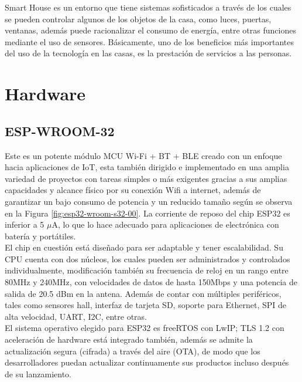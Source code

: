 Smart House es un entorno que tiene sistemas sofisticados a través de los cuales se pueden controlar algunos de los objetos de la casa, como luces, puertas, ventanas, además puede racionalizar el consumo de energía, entre otras funciones mediante el uso de sensores. Básicamente, uno de los beneficios más importantes del uso de la tecnología en las casas, es la prestación de servicios a las personas.\cite{Howedi2016} 

\section{Hardware}

\subsection{ESP-WROOM-32}

Este es un potente módulo MCU Wi-Fi + BT + BLE creado con un enfoque hacia aplicaciones de IoT, esta también dirigido e implementado en una amplia variedad de proyectos con tareas simples o más exigentes gracias a sus amplias capacidades y alcance físico por su conexión Wifi a internet, además de garantizar un bajo consumo de potencia y un reducido tamaño según se observa en la Figura \ref{fig:esp32-wroom-s32-00}. La corriente de reposo del chip ESP32 es inferior a 5 $\mu$A, lo que lo hace adecuado para aplicaciones de electrónica con batería y portátiles.\\

El chip en cuestión está diseñado para ser adaptable y tener escalabilidad. Su CPU cuenta con dos núcleos, los cuales pueden ser administrados y controlados individualmente, modificación también su frecuencia de reloj en un rango entre 80MHz y 240MHz, con velocidades de datos de hasta 150Mbps y una potencia de salida de 20.5 dBm en la antena. Además de contar con múltiples periféricos, tales como sensores hall, interfaz de tarjeta SD, soporte para Ethernet, SPI de alta velocidad, UART, I2C, entre otras.\\

El sistema operativo elegido para ESP32 es freeRTOS con LwIP; TLS 1.2 con aceleración de hardware está integrado también, además se admite la actualización segura (cifrada) a través del aire (OTA), de modo que los desarrolladores puedan actualizar continuamente sus productos incluso después de su lanzamiento.\cite{EW32}


